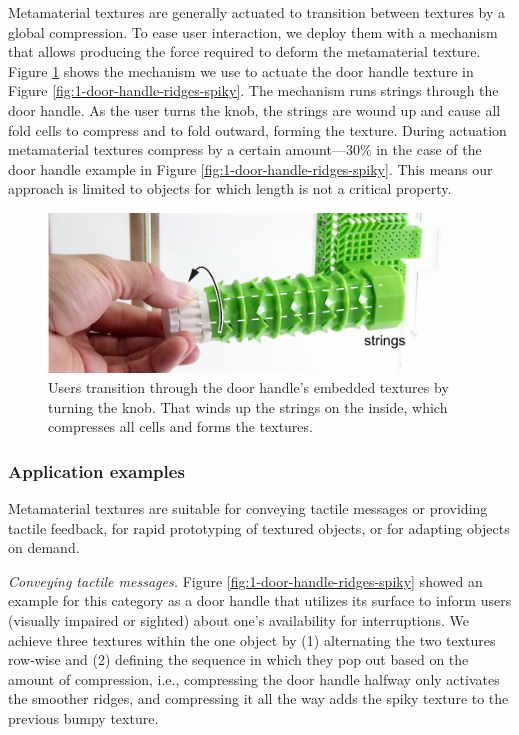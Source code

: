 Metamaterial textures are generally actuated to transition between textures by a global compression. To ease user interaction, we deploy them with a mechanism that allows producing the force required to deform the metamaterial texture. Figure \ref{fig:4-strings-in-door-handle} shows the mechanism we use to actuate the door handle texture in Figure \ref{fig:1-door-handle-ridges-spiky}. The mechanism runs strings through the door handle. As the user turns the knob, the strings are wound up and cause all fold cells to compress and to fold outward, forming the texture. During actuation metamaterial textures compress by a certain amount---30\% in the case of the door handle example in Figure \ref{fig:1-door-handle-ridges-spiky}. This means our approach is limited to objects for which length is not a critical property. 

\begin{figure} [h]  
    \includegraphics[width=\textwidth]{chapters/metamaterial-textures-FIG/4-strings-in-door-handle.pdf}
    \caption[Short figure name.]{Users transition through the door handle’s embedded textures by turning the knob. That winds up the strings on the inside, which compresses all cells and forms the textures.
    \label{fig:4-strings-in-door-handle}}
\end{figure}


\subsubsection{Application examples}

Metamaterial textures are suitable for conveying tactile messages or providing tactile feedback, for rapid prototyping of textured objects, or for adapting objects on demand. 

\textit{Conveying tactile messages. } 
Figure \ref{fig:1-door-handle-ridges-spiky} showed an example for this category as a door handle that utilizes its surface to inform users (visually impaired or sighted) about one’s availability for interruptions. We achieve three textures within the one object by (1) alternating the two textures row-wise and (2) defining the sequence in which they pop out based on the amount of compression, i.e., compressing the door handle halfway only activates the smoother ridges, and compressing it all the way adds the spiky texture to the previous bumpy texture. 

